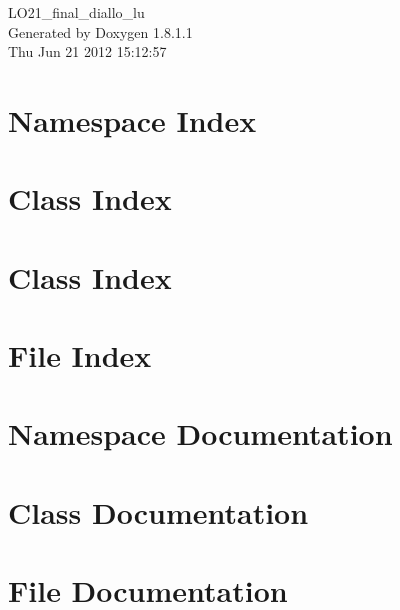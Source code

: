 \documentclass{book}
\begin{document}
\begin{titlepage}
\vspace*{7cm}
\begin{center}
{\Large L\-O21\-\_\-final\-\_\-diallo\-\_\-lu }\\
\vspace*{1cm}
{\large Generated by Doxygen 1.8.1.1}\\
\vspace*{0.5cm}
{\small Thu Jun 21 2012 15:12:57}\\
\end{center}
\end{titlepage}
\clearemptydoublepage
{}
\tableofcontents
\clearemptydoublepage
{}
\chapter{Namespace Index}

\chapter{Class Index}

\chapter{Class Index}

\chapter{File Index}

\chapter{Namespace Documentation}

\chapter{Class Documentation}














\chapter{File Documentation}








\printindex
\end{document}
